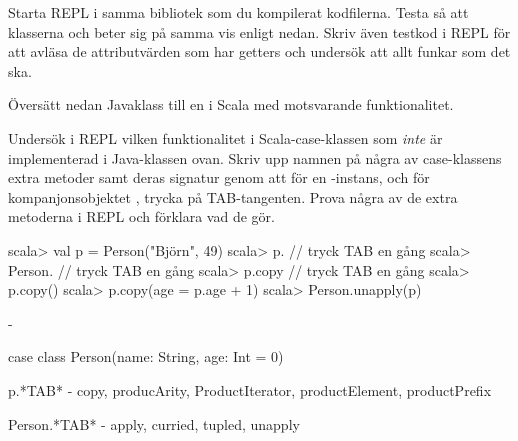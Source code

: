 \Subtask Starta REPL i samma bibliotek som du kompilerat kodfilerna. Testa så att klasserna  och  beter sig på samma vis enligt nedan. Skriv även testkod i REPL för att avläsa de attributvärden som har getters och undersök att allt funkar som det ska.


\Subtask Översätt nedan Javaklass  till en  i Scala med  motsvarande funktionalitet.




\Subtask\Pen Undersök i REPL vilken funktionalitet i Scala-case-klassen  som \emph{inte} är implementerad i Java-klassen  ovan. Skriv upp namnen på några av case-klassens extra metoder samt deras signatur genom att för en -instans, och för kompanjonsobjektet , trycka på TAB-tangenten. Prova några av de extra metoderna i REPL och förklara vad de gör.

\begin{REPL}
scala> val p = Person("Björn", 49)
scala> p.      // tryck TAB en gång
scala> Person. // tryck TAB en gång
scala> p.copy  // tryck TAB en gång
scala> p.copy()
scala> p.copy(age = p.age + 1)
scala> Person.unapply(p)
\end{REPL}


\SOLUTION


\TaskSolved \what

\SubtaskSolved   {}

\SubtaskSolved   -

\SubtaskSolved   \begin{Code}
case class Person(name: String, age: Int = 0)
\end{Code}

\SubtaskSolved  p.*TAB* - copy, producArity, ProductIterator, productElement, productPrefix

Person.*TAB* - apply, curried, tupled, unapply

